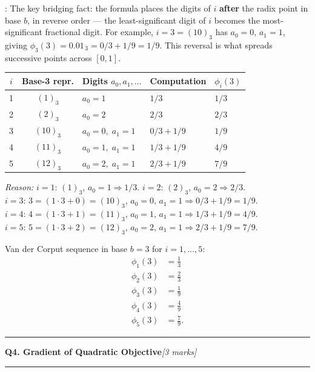 \documentclass[10pt,a4paper]{article}
\newcommand{\sectitle}[2]{%
  \vspace{10pt}\noindent\rule{\linewidth}{0.8pt}\par\vspace{2pt}%
  {\large\textbf{#1}\hfill\normalsize\textit{[#2 marks]}}\par
  \vspace{2pt}\rule{\linewidth}{0.4pt}\vspace{4pt}}
\newcommand{\reason}[1]{%
  \begin{mdframed}[backgroundcolor=reasonbg, linewidth=0.4pt,
    innertopmargin=3pt, innerbottommargin=3pt,
    innerleftmargin=6pt, innerrightmargin=6pt]
    \small\textit{Reason:} \small #1
  \end{mdframed}\vspace{2pt}}
\newcommand{\agentnote}[1]{%
  \begin{mdframed}[backgroundcolor=notebg, linewidth=0.4pt,
    innertopmargin=3pt, innerbottommargin=3pt,
    innerleftmargin=6pt, innerrightmargin=6pt]
    \small: \small #1
  \end{mdframed}\vspace{2pt}}
\newenvironment{resultbox}{%
  \begin{mdframed}[backgroundcolor=boxbg, linewidth=0.6pt,
    innertopmargin=5pt, innerbottommargin=5pt,
    innerleftmargin=8pt, innerrightmargin=8pt]
}{\end{mdframed}}
\begin{document}
\agentnote{The key bridging fact: the formula places the digits of $i$ \textbf{after}
         the radix point in base $b$, in reverse order --- the least-significant
         digit of $i$ becomes the most-significant fractional digit.
         For example, $i=3=(10)_3$ has $a_0=0,\,a_1=1$,
         giving $\phi_3(3) = 0.01_{\,3} = 0/3+1/9 = 1/9$.
         This reversal is what spreads successive points across $[0,1]$.}

\vspace{4pt}
\begin{center}
\begin{tabular}{cclll}
\toprule
$i$ & Base-3 repr. & Digits $a_0, a_1, \ldots$ & Computation & $\phi_i(3)$ \\
\midrule
1 & $(1)_3$  & $a_0=1$           & $1/3$                 & $1/3$ \\
2 & $(2)_3$  & $a_0=2$           & $2/3$                 & $2/3$ \\
3 & $(10)_3$ & $a_0=0,\;a_1=1$   & $0/3+1/9$             & $1/9$ \\
4 & $(11)_3$ & $a_0=1,\;a_1=1$   & $1/3+1/9$             & $4/9$ \\
5 & $(12)_3$ & $a_0=2,\;a_1=1$   & $2/3+1/9$             & $7/9$ \\
\bottomrule
\end{tabular}
\end{center}

\reason{%
  $i=1$: $(1)_3$, $a_0=1 \Rightarrow 1/3$. \quad
  $i=2$: $(2)_3$, $a_0=2 \Rightarrow 2/3$.\\[2pt]
  $i=3$: $3=(1{\cdot}3+0)=(10)_3$, $a_0=0,\,a_1=1 \Rightarrow 0/3+1/9=1/9$.\\[2pt]
  $i=4$: $4=(1{\cdot}3+1)=(11)_3$, $a_0=1,\,a_1=1 \Rightarrow 1/3+1/9=4/9$.\\[2pt]
  $i=5$: $5=(1{\cdot}3+2)=(12)_3$, $a_0=2,\,a_1=1 \Rightarrow 2/3+1/9=7/9$.}

\begin{resultbox}
Van der Corput sequence in base $b=3$ for $i=1,\ldots,5$:
\begin{align*}
  \phi_1(3) &= \tfrac{1}{3} \\
  \phi_2(3) &= \tfrac{2}{3} \\
  \phi_3(3) &= \tfrac{1}{9} \\
  \phi_4(3) &= \tfrac{4}{9} \\
  \phi_5(3) &= \tfrac{7}{9}.
\end{align*}
\end{resultbox}
\newpage
\sectitle{Q4. Gradient of Quadratic Objective}{3}
\end{document}
